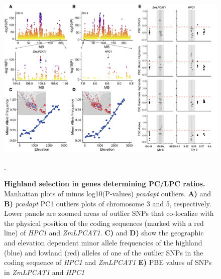 \documentclass[9pt,twocolumn,twoside,lineno]{BioRxiv}
\begin{document}
\begin{figure}[ht]
\begin{center}
\includegraphics[width=0.6\paperwidth]{Figures/Fig_2.png}
\caption{\textbf{Highland selection in genes determining PC/LPC ratios.}
Manhattan plots of minus log10(P‐values) \textit{pcadapt} outliers. 
\textbf{A)} and \textbf{B)} \textit{pcadapt} PC1 outliers plots of chromosome 3 and 5, respectively. 
Lower panels are zoomed areas of outlier SNPs that co-localize with the physical position of the coding sequences (marked with a red line) of \textit{HPC1} and \textit{ZmLPCAT1}. 
\textbf{C)} and \textbf{D)} show the geographic and elevation dependent minor allele frequencies of the highland (blue) and lowland (red) alleles of one of the outlier SNPs in the coding sequence of \textit{HPC1} and \textit{ZmLPCAT1}
\textbf{E)} PBE values of SNPs in \textit{ZmLPCAT1} and \textit{HPC1}}. 
\label{Fig2}
\end{center}
\end{figure}
\end{document}

